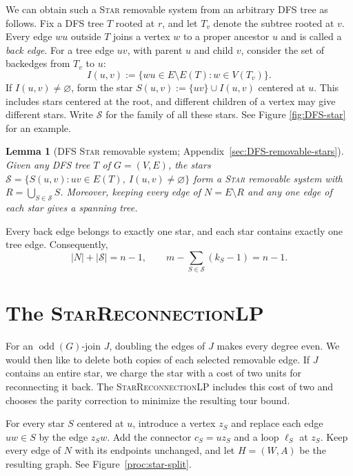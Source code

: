 \documentclass[11pt]{amsart}
\DeclareMathOperator{\odd}{odd}
\newcommand{\1}{\mathbbm{1}}
\newcommand{\LPtwo}{\textsc{StarReconnectionLP}}
\newtheorem{lemma}[theorem]{Lemma}
\begin{document}
We can obtain such a \textsc{Star} removable system from an arbitrary DFS tree as follows.
Fix a DFS tree $T$ rooted at $r$, and let $T_v$ denote the
subtree rooted at $v$. Every edge $wu$ outside $T$ joins a vertex {$w$}
to a proper ancestor $u$ and is called a \emph{back edge}. For a
tree edge $uv$, with parent $u$ and child $v$, consider the set of backedges from $T_v$ to $u$:
\[
 I(u,v) := \{{wu}\in E\setminus E(T):w\in V(T_v)\}.
\] 
If $I(u,v)\ne\varnothing$, form the star
$S(u,v):=\{uv\}\cup I(u,v)$ centered at $u$. This includes
stars centered at the root, and different children of a vertex
may give different stars.
Write $\mathcal S$ for the family of all these stars. See Figure \ref{fig:DFS-star} for an example.

\begin{lemma}[DFS \textsc{Star} removable system; Appendix~\ref{sec:DFS-removable-stars}]
\label{proc:dfs-system}
Given any DFS tree $T$ of $G=(V,E)$, the stars
$\mathcal S=\{S(u,v):uv\in E(T),\ I(u,v)\ne\varnothing\}$ form a \textsc{Star} removable system with $R = \bigcup_{S \in \mathcal{S}} S$. Moreover, keeping every edge
of $N = E\setminus R$ and any one edge of each star gives a spanning tree.
\end{lemma}

Every back edge belongs to exactly one star, and each star contains exactly one tree edge. Consequently,
\begin{equation}
\label{proc:dfs-counts}
 |N|+|\mathcal S|=n-1,
 \qquad
 m-\sum_{S\in\mathcal S}(k_S-1)=n-1.
\end{equation}

\section{The \LPtwo}
\label{proc:repair-lp}

For an $\odd(G)$-join $J$, doubling the edges of $J$ makes
every degree even. We would then like to delete both copies
of each selected removable edge. {If $J$ contains an entire
star, we charge the star with a cost of two units for reconnecting it back}. The
\LPtwo{} includes this cost of two and chooses the parity
correction to minimize the resulting tour bound.

For every star $S$ centered at $u$, introduce a vertex $z_S$
and replace each edge $uw\in S$ by the edge $z_Sw$.
Add the connector $c_S=uz_S$ and {a loop $\ell_S$ at $z_S$}. Keep every edge of $N$ with its endpoints unchanged, and let
$H=(W,A)$ be the resulting graph. { See Figure~\ref{proc:star-split}}. 
\end{document}
